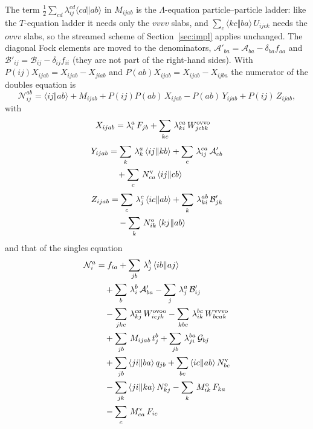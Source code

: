 \documentclass[11pt]{article}
\newcommand{\anti}[4]{\langle #1#2\Vert #3#4\rangle}
\begin{document}
The term $\tfrac12\sum_{cd}\lambda_{ij}^{cd}\anti{c}{d}{a}{b}$ in $M_{ijab}$ is the $\Lambda$-equation particle--particle ladder: like the $T$-equation ladder it needs only the $vvvv$ slabs, and $\sum_{c}\anti{k}{c}{b}{a}\,U_{ijck}$ needs the $ovvv$ slabs, so the streamed scheme of Section~\ref{sec:impl} applies unchanged.
The diagonal Fock elements are moved to the denominators, $\mathcal A'_{ba}=\mathcal A_{ba}-\delta_{ba}f_{aa}$ and
$\mathcal B'_{ij}=\mathcal B_{ij}-\delta_{ij}f_{ii}$ (they are not part of the right-hand sides). With
$P(ij)X_{ijab}=X_{ijab}-X_{jiab}$ and $P(ab)X_{ijab}=X_{ijab}-X_{ijba}$ the numerator of the doubles equation is
\begin{equation}
\mathcal N_{ij}^{ab}=\anti{i}{j}{a}{b}+M_{ijab}+P(ij)P(ab)\,X_{ijab}-P(ab)\,Y_{ijab}+P(ij)\,Z_{ijab},
\end{equation}
with
\begin{align*}
  X_{ijab} &=  \lambda_{i}^{a}\,F_{jb} +  \sum_{kc}\,\lambda_{ki}^{ca}\,W^{\rm ovvo}_{jcbk}
\end{align*}
\begin{align*}
  Y_{ijab} &=  \sum_{k}\,\lambda_{k}^{a}\,\anti{i}{j}{k}{b} +  \sum_{c}\,\lambda_{ij}^{ca}\,\mathcal A'_{cb} \notag\\
  & \quad +  \sum_{c}\,N^{\rm v}_{ca}\,\anti{i}{j}{c}{b}
\end{align*}
\begin{align*}
  Z_{ijab} &=  \sum_{c}\,\lambda_{j}^{c}\,\anti{i}{c}{a}{b} +  \sum_{k}\,\lambda_{ki}^{ab}\,\mathcal B'_{jk} \notag\\
  & \quad -  \sum_{k}\,N^{\rm o}_{ik}\,\anti{k}{j}{a}{b}
\end{align*}
and that of the singles equation
\begin{align*}
  \mathcal N_{i}^{a} &=  f_{ia} +  \sum_{jb}\,\lambda_{j}^{b}\,\anti{i}{b}{a}{j} \notag\\
  & \quad +  \sum_{b}\,\lambda_{i}^{b}\,\mathcal A'_{ba} -  \sum_{j}\,\lambda_{j}^{a}\,\mathcal B'_{ij} \notag\\
  & \quad -  \sum_{jkc}\,\lambda_{kj}^{ca}\,W^{\rm ovoo}_{icjk} -  \sum_{kbc}\,\lambda_{ik}^{bc}\,W^{\rm vvvo}_{bcak} \notag\\
  & \quad +  \sum_{jb}\,M_{ijab}\,t_{j}^{b} +  \sum_{jb}\,\lambda_{ji}^{ba}\,\mathcal G_{bj} \notag\\
  & \quad +  \sum_{jb}\,\anti{j}{i}{b}{a}\,q_{jb} +  \sum_{bc}\,\anti{i}{c}{a}{b}\,N^{\rm v}_{bc} \notag\\
  & \quad -  \sum_{jk}\,\anti{j}{i}{k}{a}\,N^{\rm o}_{kj} -  \sum_{k}\,M^{\rm o}_{ik}\,F_{ka} \notag\\
  & \quad -  \sum_{c}\,M^{\rm v}_{ca}\,F_{ic}
\end{align*}
\end{document}
